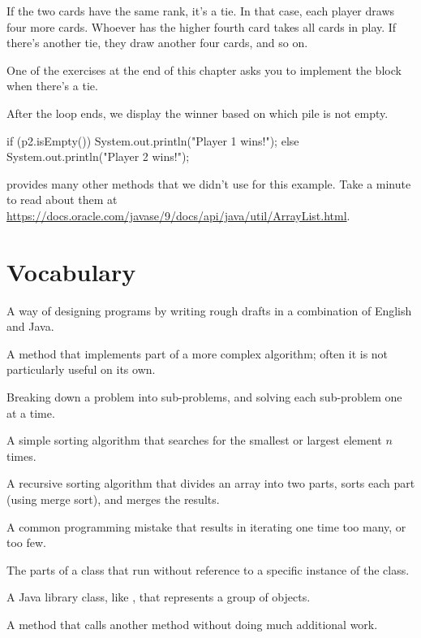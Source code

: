 If the two cards have the same rank, it's a tie.
In that case, each player draws four more cards.
Whoever has the higher fourth card takes all cards in play.
If there's another tie, they draw another four cards, and so on.

One of the exercises at the end of this chapter asks you to implement the  block when there's a tie.

After the  loop ends, we display the winner based on which pile is not empty.

\begin{code}
if (p2.isEmpty()) {
    System.out.println("Player 1 wins!");
} else {
    System.out.println("Player 2 wins!");
}
\end{code}

 provides many other methods that we didn't use for this example.
Take a minute to read about them at \url{https://docs.oracle.com/javase/9/docs/api/java/util/ArrayList.html}.


\section{Vocabulary}

\begin{description}

A way of designing programs by writing rough drafts in a combination of English and Java.

A method that implements part of a more complex algorithm; often it is not particularly useful on its own.

Breaking down a problem into sub-problems, and solving each sub-problem one at a time.

A simple sorting algorithm that searches for the smallest or largest element $n$ times.

A recursive sorting algorithm that divides an array into two parts, sorts each part (using merge sort), and merges the results.

A common programming mistake that results in iterating one time too many, or too few.

The parts of a class that run without reference to a specific instance of the class.

A Java library class, like , that represents a group of objects.

A method that calls another method without doing much additional work.


\end{description}



